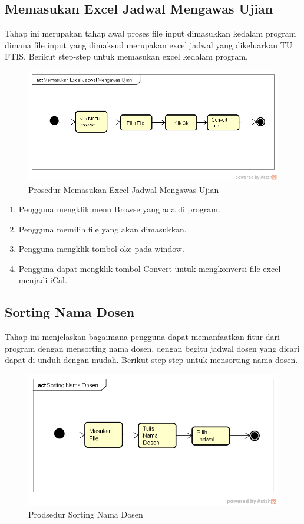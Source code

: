 \subsection{Memasukan Excel Jadwal Mengawas Ujian}
Tahap ini merupakan tahap awal proses file input dimasukkan kedalam program dimana file input yang dimaksud merupakan excel jadwal yang dikeluarkan TU FTIS. Berikut step-step untuk memasukan excel kedalam program.
\begin{figure}[h]
	\centering
	\includegraphics[scale=0.5]{Gambar/Memasukan-Excel-Jadwal-Mengawas-Ujian}
	\caption{Prosedur Memasukan Excel Jadwal Mengawas Ujian}
	\end{figure}
	
\begin{enumerate}
	\item Pengguna mengklik menu Browse yang ada di program. 
	\item Pengguna memilih file yang akan dimasukkan.
	\item Pengguna mengklik tombol oke pada window.
	\item Pengguna dapat mengklik tombol Convert untuk mengkonversi file excel menjadi iCal.
\end{enumerate}

\subsection{Sorting Nama Dosen}
Tahap ini menjelaskan bagaimana pengguna dapat memanfaatkan fitur dari program dengan mensorting nama dosen, dengan begitu jadwal dosen yang dicari dapat di unduh dengan mudah. Berikut step-step untuk mensorting nama dosen.
\begin{figure}[H]
	\centering
	\includegraphics[scale=0.5]{Gambar/Sorting-Nama-Dosen}
	\caption{Prodsedur Sorting Nama Dosen}
	\end{figure}

